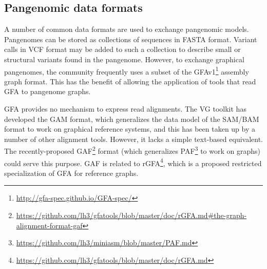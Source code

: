 \subsection{Pangenomic data formats}

A number of common data formats are used to exchange pangenomic models.
Pangenomes can be stored as collections of sequences in FASTA format.
Variant calls in VCF format may be added to such a collection to describe small or structural variants found in the pangenome.
However, to exchange graphical pangenomes, the community frequently uses a subset of the GFAv1\footnote{\url{http://gfa-spec.github.io/GFA-spec/}} assembly graph format.
This has the benefit of allowing the application of tools that read GFA to pangenome graphs.

GFA provides no mechanism to express read alignments.
The \textsc{VG} toolkit has developed the GAM format, which generalizes the data model of the SAM/BAM \cite{Li_2009} format to work on graphical reference systems, and this has been taken up by a number of other alignment tools.
However, it lacks a simple text-based equivalent.
The recently-proposed GAF\footnote{\url{https://github.com/lh3/gfatools/blob/master/doc/rGFA.md\#the-graph-alignment-format-gaf}} format (which generalizes PAF\footnote{\url{https://github.com/lh3/miniasm/blob/master/PAF.md}} to work on graphs) could serve this purpose.
GAF is related to rGFA\footnote{\url{https://github.com/lh3/gfatools/blob/master/doc/rGFA.md}}, which is a proposed restricted specialization of GFA for reference graphs.







